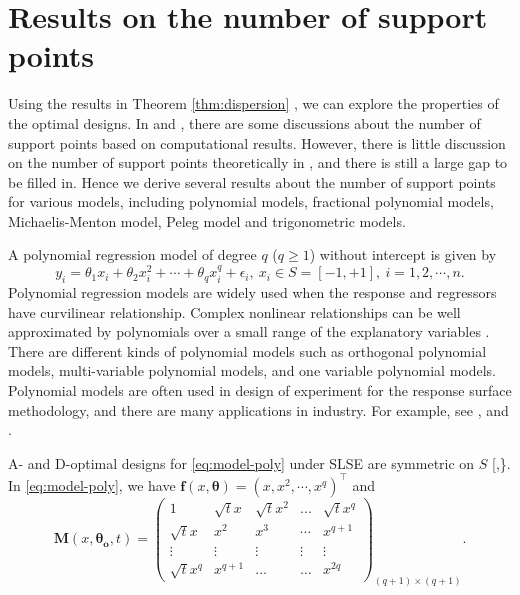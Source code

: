 \documentclass[
]{book}
\theoremstyle{definition}
\theoremstyle{definition}
\theoremstyle{definition}
\theoremstyle{definition}
\theoremstyle{remark}
\begin{document}
\section{Results on the number of support points}\label{section-support-pt}

Using the results in Theorem \ref{thm:dispersion} , we can explore the properties of the optimal designs. In \citet{yin2018optimal} and \citet{gao2017d}, there are some discussions about the number of support points based on computational results. However, there is little discussion on the number of support points theoretically in \citet{gao2017d}, and there is still a large gap to be filled in. Hence we derive several results about the number of support points for various models, including polynomial models, fractional polynomial models, Michaelis-Menton model, Peleg model and trigonometric models.

A polynomial regression model of degree \(q\) (\(q \ge 1\)) without intercept is given by
\begin{equation}
y_i=\theta_1 x_i+\theta_2 x_i^2+\cdots+\theta_q x_i^q+\epsilon_i,~x_i\in S=[-1,+1],~i=1,2,\cdots,n.
\label{eq:model-poly}
\end{equation}
Polynomial regression models are widely used when the response and regressors have curvilinear relationship. Complex nonlinear relationships can be well approximated by polynomials over a small range of the explanatory variables \citep[p.~223]{montgomery2012introduction}. There are different kinds of polynomial models such as orthogonal polynomial models, multi-variable polynomial models, and one variable polynomial models. Polynomial models are often used in design of experiment for the response surface methodology, and there are many applications in industry. For example, see \citet{box1987empirical}, \citet{box1978statistics} and \citet{khuri1996response}.

A- and D-optimal designs for \eqref{eq:model-poly} under SLSE are symmetric on \(S\) {[}\citet{yin2018optimal},\citet{gao2017d}\}. In \eqref{eq:model-poly}, we have
\(\boldsymbol{f}(x,\boldsymbol{\theta})= \left(x,x^2,\cdots, x^q \right)^\top\) and
\begin{equation}
\boldsymbol{M}(x,\boldsymbol{\theta_o},t)=\begin{pmatrix}
1           &\sqrt{t}x  &\sqrt{t}x^2    &...&\sqrt{t}x^q\\
\sqrt{t}x   &   x^2     &x^3    &\cdots &x^{q+1}\\
\vdots      &\vdots     &\vdots &\vdots&    \vdots\\
\sqrt{t}x^q &   x^{q+1} &\dots  &\dots  &x^{2q}
\end{pmatrix}_{(q+1)\times(q+1)}.
\label{eq:poly}
\end{equation}
\end{document}
